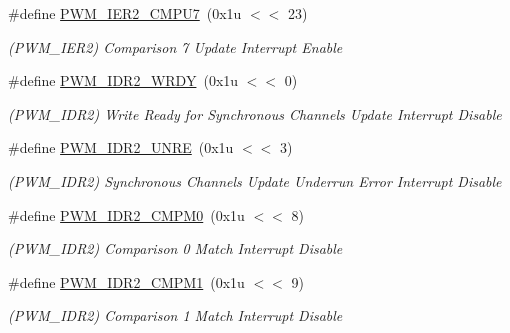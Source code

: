 \begin{DoxyCompactItemize}
\mbox{\label{group__SAMV71__PWM_ga61e0f7f0a72e26960e25d864347fd490}} 
\#define \mbox{\hyperlink{group__SAMV71__PWM_ga61e0f7f0a72e26960e25d864347fd490}{P\+W\+M\+\_\+\+I\+E\+R2\+\_\+\+C\+M\+P\+U7}}~(0x1u $<$$<$ 23)
\begin{DoxyCompactList}\small\item\em (P\+W\+M\+\_\+\+I\+E\+R2) Comparison 7 Update Interrupt Enable \end{DoxyCompactList}\item 
\mbox{\label{group__SAMV71__PWM_ga98ee7de3368f975b0eea10fcefb8c2f2}} 
\#define \mbox{\hyperlink{group__SAMV71__PWM_ga98ee7de3368f975b0eea10fcefb8c2f2}{P\+W\+M\+\_\+\+I\+D\+R2\+\_\+\+W\+R\+DY}}~(0x1u $<$$<$ 0)
\begin{DoxyCompactList}\small\item\em (P\+W\+M\+\_\+\+I\+D\+R2) Write Ready for Synchronous Channels Update Interrupt Disable \end{DoxyCompactList}\item 
\mbox{\label{group__SAMV71__PWM_ga94428564f270df1c0e1605970f49f669}} 
\#define \mbox{\hyperlink{group__SAMV71__PWM_ga94428564f270df1c0e1605970f49f669}{P\+W\+M\+\_\+\+I\+D\+R2\+\_\+\+U\+N\+RE}}~(0x1u $<$$<$ 3)
\begin{DoxyCompactList}\small\item\em (P\+W\+M\+\_\+\+I\+D\+R2) Synchronous Channels Update Underrun Error Interrupt Disable \end{DoxyCompactList}\item 
\mbox{\label{group__SAMV71__PWM_gab45de8d48554f6be73fd3e08949cea86}} 
\#define \mbox{\hyperlink{group__SAMV71__PWM_gab45de8d48554f6be73fd3e08949cea86}{P\+W\+M\+\_\+\+I\+D\+R2\+\_\+\+C\+M\+P\+M0}}~(0x1u $<$$<$ 8)
\begin{DoxyCompactList}\small\item\em (P\+W\+M\+\_\+\+I\+D\+R2) Comparison 0 Match Interrupt Disable \end{DoxyCompactList}\item 
\mbox{\label{group__SAMV71__PWM_gac6f97bd578e09de48d19582ba4d00e96}} 
\#define \mbox{\hyperlink{group__SAMV71__PWM_gac6f97bd578e09de48d19582ba4d00e96}{P\+W\+M\+\_\+\+I\+D\+R2\+\_\+\+C\+M\+P\+M1}}~(0x1u $<$$<$ 9)
\begin{DoxyCompactList}\small\item\em (P\+W\+M\+\_\+\+I\+D\+R2) Comparison 1 Match Interrupt Disable \end{DoxyCompactList}\item 
$$
\end{DoxyCompactItemize}

